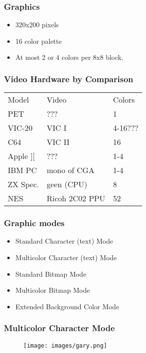 \documentclass[aspectratio=43]{uva-inf-presentation}
\begin{document}

\begin{frame}
\frametitle{Graphics}

\begin{itemize}
\item 320x200 pixels
\item 16 color palette
\item At most 2 or 4 colors per 8x8 block.
\end{itemize}

\end{frame}


\begin{frame}
\frametitle{Video Hardware by Comparison}

\begin{tabular}{|l|l|l|}
\hline Model & Video & Colors \\
PET & ??? & 1 \\
VIC-20 & VIC I & 4-16??? \\
C64 & VIC II & 16 \\
Apple ][ & ??? & 1-4 \\
IBM PC & mono of CGA & 1-4 \\
ZX Spec. & geen (CPU) & 8 \\ \hline
NES & Ricoh 2C02 PPU & 52 \\ \hline
\end{tabular}

\end{frame}

\begin{frame}
\frametitle{Graphic modes}

\begin{itemize}
\item Standard Character (text) Mode
\item Multicolor Character (text) Mode
\item Standard Bitmap Mode
\item Multicolor Bitmap Mode
\item Extended Background Color Mode
\end{itemize}

\end{frame}


\begin{frame}
\frametitle{Multicolor Character Mode}

\begin{figure}
\texttt{[image: images/gary.png]}
\end{figure}

\end{frame}
\end{document}
